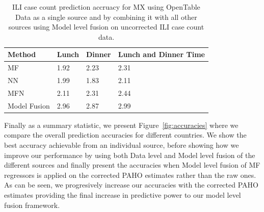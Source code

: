 \begin{table}[tb!]
\centering
\caption{\label{tb:opentable}  ILI case count prediction accruacy for MX using OpenTable Data as a single source and
by combining it with all other sources using Model level fusion on uncorrected ILI case count data.}
\vspace{1em}
\begin{tabular}{|p{1.5cm}|*{2}{l|}p{2cm}|}
\hline
Method& Lunch & Dinner & Lunch and Dinner Time \\
\hline \hline
MF   & 1.92 & 2.23 & 2.31 \\
NN   & 1.99 & 1.83 & 2.11 \\
MFN  & 2.11 & 2.31 & 2.44 \\
Model Fusion & 2.96 & 2.87 & 2.99 \\
\hline
\end{tabular}
\end{table}

Finally as a summary statistic, we present Figure~\ref{fig:accuracies} where we compare
the overall prediction accuracies for different countries. We show the best
accuracy achievable from an individual source, before showing how we improve our 
performance by using both Data level and Model level fusion of the different sources and finally 
present the accuracies when Model level fusion of MF regressors is applied on the corrected PAHO 
estimates rather than the raw ones. As can be seen, we progresively increase our accuracies
with the corrected PAHO estimates providing the final increase in predictive power to 
our model level fusion framework.

